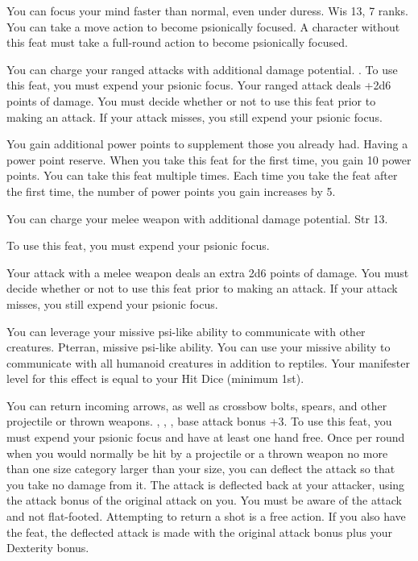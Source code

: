 {You can focus your mind faster than normal, even under duress.}
{Wis 13,  7 ranks.}
{You can take a move action to become psionically focused.}
{A character without this feat must take a full-round action to become psionically focused.}
{}

{You can charge your ranged attacks with additional damage potential.}
{.}
{To use this feat, you must expend your psionic focus. Your ranged attack deals +2d6 points of damage. You must decide whether or not to use this feat prior to making an attack. If your attack misses, you still expend your psionic focus.}
{}{}

{You gain additional power points to supplement those you already had.}
{Having a power point reserve.}
{When you take this feat for the first time, you gain 10 power points.}
{}
{You can take this feat multiple times. Each time you take the feat after the first time, the number of power points you gain increases by 5.}

{You can charge your melee weapon with additional damage potential.}
{Str 13.}
{To use this feat, you must expend your psionic focus.

Your attack with a melee weapon deals an extra 2d6 points of damage. You must decide whether or not to use this feat prior to making an attack. If your attack misses, you still expend your psionic focus.}
{}{}

{You can leverage your missive psi-like ability to communicate with other creatures.}
{Pterran, missive psi-like ability.}
{You can use your missive ability to communicate with all humanoid creatures in addition to reptiles. Your manifester level for this effect is equal to \onehalf your Hit Dice (minimum 1st).}
{}{}

{You can return incoming arrows, as well as crossbow bolts, spears, and other projectile or thrown weapons.}
{, , , base attack bonus +3.}
{To use this feat, you must expend your psionic focus and have at least one hand free. Once per round when you would normally be hit by a projectile or a thrown weapon no more than one size category larger than your size, you can deflect the attack so that you take no damage from it. The attack is deflected back at your attacker, using the attack bonus of the original attack on you. You must be aware of the attack and not flat-footed. Attempting to return a shot is a free action.}
{}
{If you also have the  feat, the deflected attack is made with the original attack bonus plus your Dexterity bonus.}

